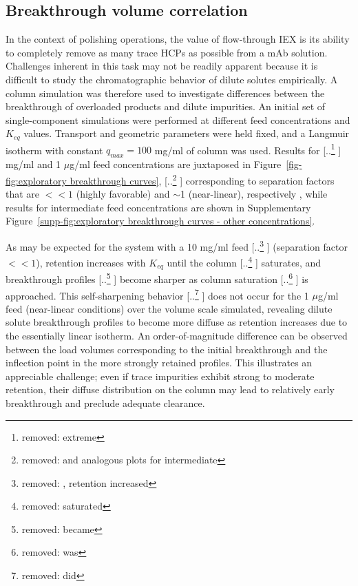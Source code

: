 \documentclass[preprint,review,12pt]{elsarticle}
\providecommand{\DIFaddtex}[1]{{\protect\color{blue} \sf #1}} %
\providecommand{\DIFdeltex}[1]{{\protect\color{red} [..\footnote{removed: #1} ]}} %
\providecommand{\DIFaddbegin}{} %
\providecommand{\DIFaddend}{} %
\providecommand{\DIFdelbegin}{} %
\providecommand{\DIFdelend}{} %
\providecommand{\DIFadd}[1]{\texorpdfstring{\DIFaddtex{#1}}{#1}} %
\providecommand{\DIFdel}[1]{\texorpdfstring{\DIFdeltex{#1}}{}} %
\begin{document}
    \subsection{Breakthrough volume correlation} \label{ssec:break vol corr}
        In the context of polishing operations, the value of flow-through IEX is its ability to completely remove as many trace HCPs as possible from a mAb solution. Challenges inherent in this task may not be readily apparent because it is difficult to study the chromatographic behavior of dilute solutes empirically. A column simulation was therefore used to investigate differences between the breakthrough of overloaded products and dilute impurities. An initial set of single-component simulations were performed at different feed concentrations and $K_{eq}$ values. Transport and geometric parameters were held fixed, and a Langmuir isotherm with constant $q_{max} = 100$ mg/ml of column was used. Results for \DIFdelbegin \DIFdel{extreme }\DIFdelend \DIFaddbegin \DIFadd{10 mg/ml and 1 $\mu$g/ml }\DIFaddend feed concentrations are juxtaposed in Figure~\ref{fig-fig:exploratory breakthrough curves}, \DIFdelbegin \DIFdel{and analogous plots for intermediate }\DIFdelend \DIFaddbegin \DIFadd{corresponding to separation factors that are $<< 1$ (highly favorable) and $\sim$1 (near-linear), respectively \cite{perrys}, while results for intermediate feed }\DIFaddend concentrations are shown in Supplementary Figure~\ref{supp-fig:exploratory breakthrough curves - other concentrations}.
\DIFaddbegin 


        \DIFaddend As may be expected for the system with a 10 mg/ml feed \DIFdelbegin \DIFdel{, retention increased }\DIFdelend \DIFaddbegin \DIFadd{(separation factor $<< 1$), retention increases }\DIFaddend with $K_{eq}$ until the column \DIFdelbegin \DIFdel{saturated}\DIFdelend \DIFaddbegin \DIFadd{saturates}\DIFaddend , and breakthrough profiles \DIFdelbegin \DIFdel{became }\DIFdelend \DIFaddbegin \DIFadd{become }\DIFaddend sharper as column saturation \DIFdelbegin \DIFdel{was }\DIFdelend \DIFaddbegin \DIFadd{is }\DIFaddend approached. This self-sharpening behavior \DIFdelbegin \DIFdel{did }\DIFdelend \DIFaddbegin \DIFadd{does }\DIFaddend not occur for the 1 $\mu$g/ml feed \DIFaddbegin \DIFadd{(near-linear conditions) }\DIFaddend over the volume scale simulated, revealing dilute solute breakthrough profiles to become more diffuse as retention increases due to the essentially linear isotherm. An order-of-magnitude difference can be observed between the load volumes corresponding to the initial breakthrough and the inflection point in the more strongly retained profiles. This illustrates an appreciable challenge; even if trace impurities exhibit strong to moderate retention, their diffuse distribution on the column may lead to relatively early breakthrough and preclude adequate clearance.
\end{document}
